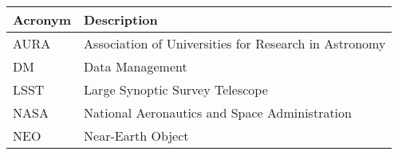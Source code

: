 \addtocounter{table}{-1}
\begin{longtable}{|l|p{}|}\hline
\textbf{Acronym} & \textbf{Description}  \\\hline

AURA & Association of Universities for Research in Astronomy \\\hline
DM & Data Management \\\hline
LSST & Large Synoptic Survey Telescope \\\hline
NASA & National Aeronautics and Space Administration \\\hline
NEO & Near-Earth Object \\\hline
\end{longtable}

